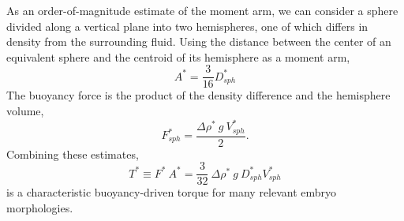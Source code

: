 \documentclass[10pt,a4paper]{article}
\def\non{\nonumber}
\begin{document}
As an order-of-magnitude estimate of the moment arm, we can consider a sphere divided along a vertical plane into two hemispheres, one of which differs in density from the surrounding fluid. Using the distance between the center of an equivalent sphere and the centroid of its hemisphere as a moment arm,
\begin{equation}\label{arm}
	A^* = \frac{3}{16} D_{sph}^*
\end{equation}
The buoyancy force is the product of the density difference and the hemisphere volume,
%
\begin{equation}\label{charF}
	F_{sph}^* = \frac{\Delta \rho^* ~ g ~ V_{sph}^*}{2}.  %
\end{equation} 
Combining these estimates,
\begin{equation}\label{charT}
	T^* \equiv F^* ~ A^* = \frac{3}{32} ~ \Delta \rho^* ~ g ~ D_{sph}^* V_{sph}^* 
\end{equation}
is a characteristic buoyancy-driven torque for many relevant embryo morphologies.
% 
%
\end{document}
